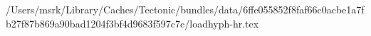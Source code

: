 /Users/msrk/Library/Caches/Tectonic/bundles/data/6ffe055852f8faf66c0acbe1a7fb27f87b869a90bad1204f3bf4d9683f597c7c/loadhyph-hr.tex
